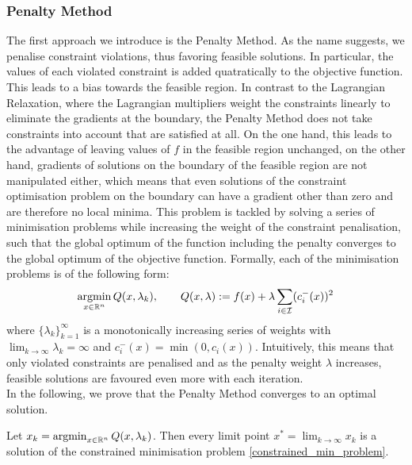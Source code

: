 \subsubsection{Penalty Method}
The first approach we introduce is the Penalty Method. As the name suggests, we penalise constraint violations, thus favoring feasible solutions. In particular, the values of each violated constraint is added quatratically to the objective function. This leads to a bias towards the feasible region. In contrast to the Lagrangian Relaxation, where the Lagrangian multipliers weight the constraints linearly to eliminate the gradients at the boundary, the Penalty Method does not take constraints into account that are satisfied at all. On the one hand, this leads to the advantage of leaving values of $f$ in the feasible region unchanged, on the other hand, gradients of solutions on the boundary of the feasible region are not manipulated either, which means that even solutions of the constraint optimisation problem on the boundary can have a gradient other than zero and are therefore no local minima. This problem is tackled by solving a series of minimisation problems while increasing the weight of the constraint penalisation, such that the global optimum of the function including the penalty converges to the global optimum of the objective function. Formally, each of the minimisation problems is of the following form:
\[\operatorname*{argmin}_{x \in \mathbb{R}^n} Q(x, \lambda_k), \qquad Q(x, \lambda) := f(x) + \lambda \sum_{i \in \mathcal{I}} (c_i^{-}(x))^2\]
where $\{\lambda_k\}_{k=1}^\infty$ is a monotonically increasing series of weights with $\lim_{k \to \infty} \lambda_k = \infty$ and $c_i^-(x) = \min(0, c_i(x))$. Intuitively, this means that only violated constraints are penalised and as the penalty weight $\lambda$ increases, feasible solutions are favoured even more with each iteration.\\
In the following, we prove that the Penalty Method converges to an optimal solution.
\begin{theorem}
	Let $x_k = \operatorname*{argmin}_{x \in \mathbb{R}^n} Q(x, \lambda_k)$. Then every limit point $x^* = \lim_{k \to \infty} x_k$ is a solution of the constrained minimisation problem \eqref{constrained_min_problem}.
\end{theorem}
